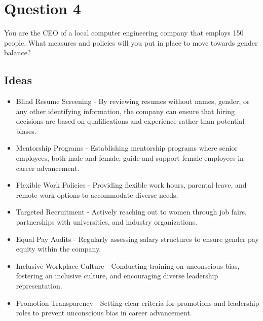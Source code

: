 \documentclass{article}
\begin{document}
\section{Question 4}
You are the CEO of a local computer engineering company that employs 150 people. What measures and policies will you put in place to move towards gender balance?

\subsection{Ideas}
\begin{itemize}
    \item Blind Resume Screening - By reviewing resumes without names, gender, or any other identifying information, the company can ensure that hiring decisions are based on qualifications and experience rather than potential biases.
    \item Mentorship Programs - Establishing mentorship programs where senior employees, both male and female, guide and support female employees in career advancement.
    \item Flexible Work Policies - Providing flexible work hours, parental leave, and remote work options to accommodate diverse needs.
    \item Targeted Recruitment - Actively reaching out to women through job fairs, partnerships with universities, and industry organizations.
    \item Equal Pay Audits - Regularly assessing salary structures to ensure gender pay equity within the company.
    \item Inclusive Workplace Culture - Conducting training on unconscious bias, fostering an inclusive culture, and encouraging diverse leadership representation.
    \item Promotion Transparency - Setting clear criteria for promotions and leadership roles to prevent unconscious bias in career advancement.
\end{itemize}
\end{document}
